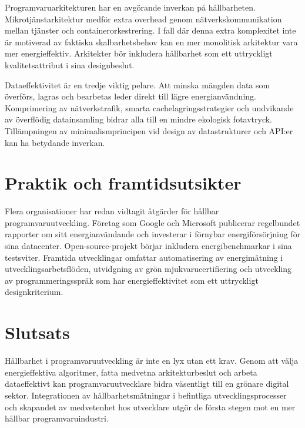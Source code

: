 \documentclass[
    language=swedish,
    doctype=article,
]{../../omnilatex}
\begin{document}
Programvaruarkitekturen har en avgörande inverkan på hållbarheten. Mikrotjänstarkitektur medför extra overhead genom nätverkskommunikation mellan tjänster och containerorkestrering. I fall där denna extra komplexitet inte är motiverad av faktiska skalbarhetsbehov kan en mer monolitisk arkitektur vara mer energieffektiv. Arkitekter bör inkludera hållbarhet som ett uttryckligt kvalitetsattribut i sina designbeslut.

Dataeffektivitet är en tredje viktig pelare. Att minska mängden data som överförs, lagras och bearbetas leder direkt till lägre energianvändning. Komprimering av nätverkstrafik, smarta cachelagringsstrategier och undvikande av överflödig datainsamling bidrar alla till en mindre ekologisk fotavtryck. Tillämpningen av minimalismprincipen vid design av datastrukturer och API:er kan ha betydande inverkan.

\section{Praktik och framtidsutsikter}
Flera organisationer har redan vidtagit åtgärder för hållbar programvaruutveckling. Företag som Google och Microsoft publicerar regelbundet rapporter om sitt energianvändande och investerar i förnybar energiförsörjning för sina datacenter. Open-source-projekt börjar inkludera energibenchmarkar i sina testsviter. Framtida utvecklingar omfattar automatisering av energimätning i utvecklingsarbetsflöden, utvidgning av grön mjukvarucertifiering och utveckling av programmeringsspråk som har energieffektivitet som ett uttryckligt designkriterium.

\section{Slutsats}
Hållbarhet i programvaruutveckling är inte en lyx utan ett krav. Genom att välja energieffektiva algoritmer, fatta medvetna arkitekturbeslut och arbeta dataeffektivt kan programvaruutvecklare bidra väsentligt till en grönare digital sektor. Integrationen av hållbarhetsmätningar i befintliga utvecklingsprocesser och skapandet av medvetenhet hos utvecklare utgör de första stegen mot en mer hållbar programvaruindustri.
\end{document}
